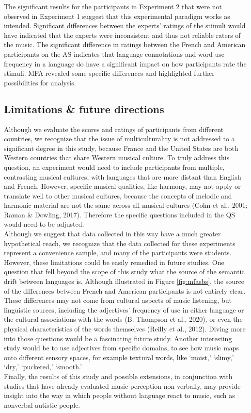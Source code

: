\documentclass[
  english,
  man,floatsintext]{apa6}
\begin{document}
The significant results for the participants in Experiment 2 that were not observed in Experiment 1 suggest that this experimental paradigm works as intended. Significant differences between the experts' ratings of the stimuli would have indicated that the experts were inconsistent and thus not reliable raters of the music. The significant difference in ratings between the French and American participants on the AS indicates that language connotations and word use frequency in a language do have a significant impact on how participants rate the stimuli. MFA revealed some specific differences and highlighted further possibilities for analysis.

\hypertarget{limitations-future-directions}{%
\subsection{Limitations \& future directions}\label{limitations-future-directions}}

Although we evaluate the scores and ratings of participants from different countries, we recognize that the issue of multiculturality is not addressed to a significant degree in this study, because France and the United States are both Western countries that share Western musical culture. To truly address this question, an experiment would need to include participants from multiple, contrasting musical cultures, with languages that are more distant than English and French. However, specific musical qualities, like harmony, may not apply or translate well to other musical cultures, because the concepts of melodic and harmonic material are not the same across all musical cultures (Cohn et al., 2001; Raman \& Dowling, 2017). Therefore the specific questions included in the QS would need to be adjusted.\\
Although we suggest that data collected in this way have a much greater hypothetical reach, we recognize that the data collected for these experiments represent a convenience sample, and many of the participants were students. However, these limitations could be easily remedied in future studies.
One question that fell beyond the scope of this study what the source of the semantic drift between languages is. Although illustrated in Figure \ref{fig:mfasbs}, the source of the differences between French and American participants is not entirely clear. These differences may not come from cultural aspects of music listening, but linguistic sources, including the adjectives' frequency of use in either language or the cultural associations with the words (B. Thompson et al., 2020), or even the physical characteristics of the words themselves (Reilly et al., 2012). Diving more into those questions would be a fascinating future study. Another interesting study would be to use adjectives from specific domains, to see how music maps onto different sensory spaces, for example textural words, like `moist,' `slimy,' `dry,' `puckered,' `smooth.'\\
Finally, the results of this study and possible extensions, in conjunction with studies that have already evaluated music perception non-verbally, may provide insight into the way in which people without language react to music, such as nonverbal autistic people.
\end{document}
